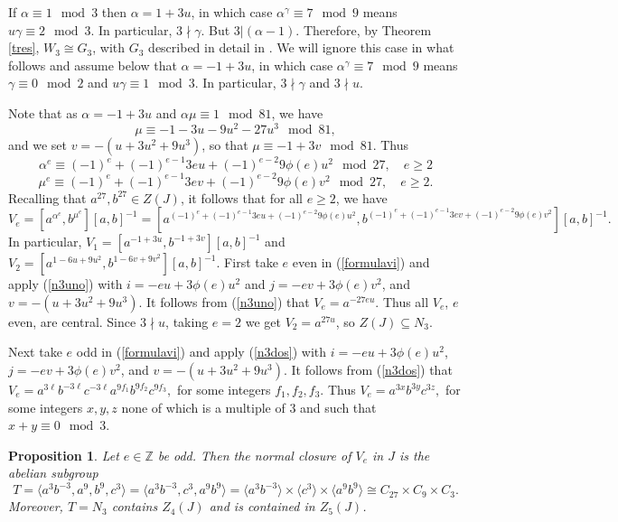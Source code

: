 \documentclass{amsart}
\newtheorem{prop}[theorem]{Proposition}
\theoremstyle{definition}
\theoremstyle{remark}
\newcommand \Z{{\mathbb Z}}
\begin{document}
{If $\alpha\equiv 1\mod 3$ then $\alpha=1+3u$, in which case $\alpha^\gamma\equiv 7\mod 9$ means $u\gamma\equiv 2\mod 3$.
In particular, $3\nmid\gamma$. But $3|(\alpha-1)$. Therefore, by Theorem \ref{tres}, $W_3\cong G_3$,  with $G_3$
described in detail in \cite{MS}. We will ignore this case in what follows and assume below that $\alpha=-1+3u$, in which
case $\alpha^\gamma\equiv 7\mod 9$ means $\gamma\equiv 0\mod 2$ and $u\gamma\equiv 1\mod 3$.
In particular, $3\nmid\gamma$ and  $3\nmid u$.

 

Note that as $\alpha=-1+3u$ and $\alpha\mu\equiv 1\mod 81$, we have $$\mu\equiv -1-3u-9u^2-27u^3\mod 81,$$ and we
set $v=-(u+3u^2+9u^3)$, so that $\mu\equiv -1+3v\mod 81$. Thus
$$
\alpha^e\equiv (-1)^e+(-1)^{e-1} 3 eu+(-1)^{e-2} 9\phi(e) u^2\mod 27,\quad e\geq 2
$$
$$
\mu^e\equiv (-1)^e+(-1)^{e-1} 3 ev+(-1)^{e-2} 9 \phi(e) v^2\mod 27, \quad e\geq 2.
$$
Recalling that $a^{27},b^{27}\in Z(J)$, it follows that for all $e\geq 2$, we have
\begin{equation}
\label{formulavi}
V_e=[a^{\alpha^e},b^{\mu^e}][a,b]^{-1}=[a^{(-1)^e+(-1)^{e-1} 3 eu+(-1)^{e-2}9\phi (e) u^2},
b^{(-1)^e+(-1)^{e-1} 3 ev+(-1)^{e-2}9\phi(e) v^2}][a,b]^{-1}.
\end{equation}
In particular,
$
V_1=[a^{-1+3u},
b^{-1+3v}][a,b]^{-1}
$ 
and
$
V_2=[a^{1-6u+9u^2},b^{1-6v+9v^2}][a,b]^{-1}.
$
First take $e$ even in (\ref{formulavi}) and apply (\ref{n3uno})  with $i=-eu+3\phi(e)u^2$
and $j=-ev+3\phi(e)v^2$,  and $v=-(u+3u^2+9u^3)$. It follows from (\ref{n3uno})
that 
$
V_e=a^{-27eu}.
$
Thus all $V_e$, $e$ even, are central. Since $3\nmid u$, taking $e=2$ we get $V_2=a^{27u}$,
so $Z(J)\subseteq N_3$. 

Next take $e$ odd in (\ref{formulavi}) and apply (\ref{n3dos})  with $i=-eu+3\phi(e)u^2$,
$j=-ev+3\phi(e)v^2$,  and $v=-(u+3u^2+9u^3)$. It follows from (\ref{n3dos})
that 
$
V_e=a^{3\ell} b^{-3\ell}c^{-3\ell}a^{9f_1}b^{9f_2}c^{9f_3},
$
for some integers $f_1,f_2,f_3$. Thus
$
V_e=a^{3x} b^{3y}c^{3z},
$
for some integers $x,y,z$ none of which is a multiple of 3 and such that $x+y\equiv 0\mod 3$.

\begin{prop}\label{poop} Let $e\in\Z$ be odd. Then the normal closure of $V_e$ in $J$ is the abelian
subgroup
$$
T=\langle a^3b^{-3}, a^9, b^9,c^3\rangle=\langle a^3b^{-3}, c^3, a^9b^9\rangle=
\langle a^3b^{-3}\rangle\times \langle c^3\rangle\times \langle a^9b^9\rangle
\cong C_{27}\times C_9\times C_3. 
$$
Moreover, $T=N_3$ contains $Z_4(J)$ and is contained in $Z_5(J)$.  
\end{prop}

}
\end{document}
